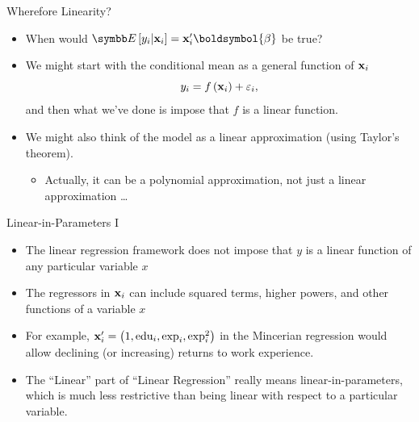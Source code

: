 \documentclass[aspectratio=169,11pt]{beamer}
\begin{document}
\begin{frame}{Wherefore Linearity?}
\begin{itemize}
	\item When would $\E\left[y_i|{\bf x}_i\right] = {\bf x}_i'\boldsymbol{\beta}$ be true?

	\medskip
	\item We might start with the conditional mean as a general function of ${\bf x}_i$\[
	 y_{i} = f\left({\bf x}_{i}\right)+\varepsilon_{i},
	\]
	and then what we've done is impose that $f$ is a linear function. 

		\medskip
	\item We might also think of the model as a linear approximation (using Taylor's theorem). 
	\begin{itemize}
		\item Actually, it can be a polynomial approximation, not just a linear approximation \dots
	\end{itemize}
\end{itemize}
\end{frame}


\begin{frame}{Linear-in-Parameters I}
\begin{itemize}
	\item The linear regression framework does not impose that $y$ is a linear function of any
	particular variable $x$

	\medskip
	\item The regressors in ${\bf x}_i$ can include squared terms, higher powers, and other functions of 
	a variable $x$

	\medskip
	\item For example, ${\bf x}_i' = \left(1,\text{edu}_i,\text{exp}_i,\text{exp}_i^2\right)$ in the Mincerian regression would allow
	declining (or increasing) returns to work experience. 

	\medskip
	\item The ``Linear'' part of ``Linear Regression'' really means linear-in-parameters, which is much less
	 restrictive than being linear with respect to a particular variable.
\end{itemize}
\end{frame}
\end{document}
